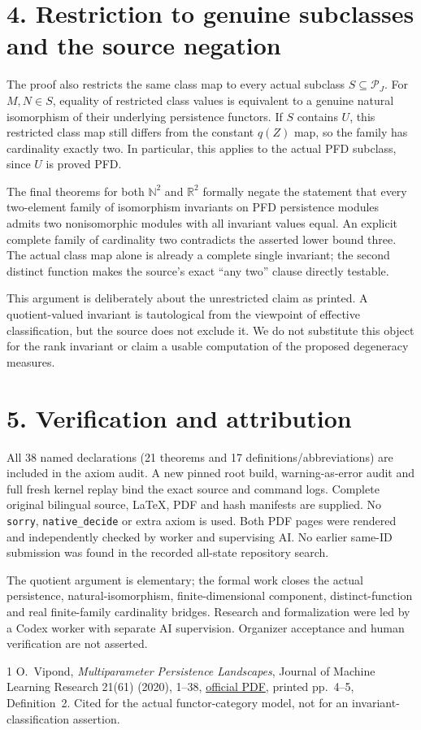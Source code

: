 \documentclass[10pt]{article}
\begin{document}
\section*{4. Restriction to genuine subclasses and the source negation}
The proof also restricts the same class map to every actual subclass $S\subseteq\mathcal P_J$. For $M,N\in S$, equality of restricted class values is equivalent to a genuine natural isomorphism of their underlying persistence functors. If $S$ contains $U$, this restricted class map still differs from the constant $q(Z)$ map, so the family has cardinality exactly two. In particular, this applies to the actual PFD subclass, since $U$ is proved PFD.

The final theorems for both $\mathbb N^2$ and $\mathbb R^2$ formally negate the statement that every two-element family of isomorphism invariants on PFD persistence modules admits two nonisomorphic modules with all invariant values equal. An explicit complete family of cardinality two contradicts the asserted lower bound three. The actual class map alone is already a complete single invariant; the second distinct function makes the source's exact ``any two'' clause directly testable.

This argument is deliberately about the unrestricted claim as printed. A quotient-valued invariant is tautological from the viewpoint of effective classification, but the source does not exclude it. We do not substitute this object for the rank invariant or claim a usable computation of the proposed degeneracy measures.

\section*{5. Verification and attribution}
All 38 named declarations (21 theorems and 17 definitions/abbreviations) are included in the axiom audit. A new pinned root build, warning-as-error audit and full fresh kernel replay bind the exact source and command logs. Complete original bilingual source, LaTeX, PDF and hash manifests are supplied. No \texttt{sorry}, \texttt{native\_decide} or extra axiom is used. Both PDF pages were rendered and independently checked by worker and supervising AI. No earlier same-ID submission was found in the recorded all-state repository search.

The quotient argument is elementary; the formal work closes the actual persistence, natural-isomorphism, finite-dimensional component, distinct-function and real finite-family cardinality bridges. Research and formalization were led by a Codex worker with separate AI supervision. Organizer acceptance and human verification are not asserted.

\begin{thebibliography}{1}
 O.~Vipond, \emph{Multiparameter Persistence Landscapes}, Journal of Machine Learning Research 21(61) (2020), 1--38, \href{https://www.jmlr.org/papers/volume21/19-054/19-054.pdf}{official PDF}, printed pp.~4--5, Definition~2. Cited for the actual functor-category model, not for an invariant-classification assertion.
\end{thebibliography}
\end{document}
